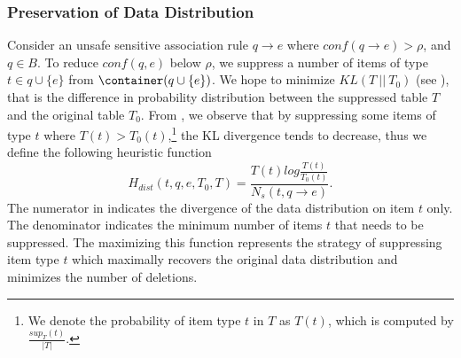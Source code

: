 \subsubsection{Preservation of Data Distribution}
Consider an unsafe sensitive association rule $q \rightarrow e$ where
$conf(q \rightarrow e) > \rho$, and $q \in B$.
To reduce $conf(q,e)$ below $\rho$,
we suppress a number of items of type $t\in q \cup \{e\}$ from
$\container(q\cup \{e\})$. We hope to minimize $KL(T ~||~ T_0)$
(see ), that is
the difference in probability distribution between the suppressed table $T$
and the original table $T_0$.
From , we observe that by suppressing some items of type $t$
where $T(t)>T_0(t)$,\footnote{We denote the probability of item type $t$ in $T$
as $T(t)$, which is computed by $\frac{sup_T(t)}{|T|}$.}
the KL divergence tends to decrease, thus we define
the following heuristic function
\begin{equation}\label{eq:hdist}
H_{dist}(t, q, e, T_0, T) =
	\frac{T(t)log\frac{T(t)}{T_0(t)}}{N_s(t, q\rightarrow e)}.
\end{equation}
The numerator in  indicates the divergence of
the data distribution on item $t$ only.
The denominator indicates the minimum number of items $t$ that needs
to be suppressed.
The maximizing this function represents the strategy of
suppressing item type $t$ which maximally recovers the original
data distribution and minimizes the number of deletions.

